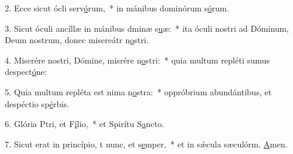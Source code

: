 2. Ecce sicut ócli serv\uline{ó}rum,~* in mánibus dominórum s\uline{ó}rum.\par 
3. Sicut óculi ancíllæ in mánibus dminæ s\uline{u}æ:~* ita óculi nostri ad Dóminum, Deum nostrum, donec misereátr n\uline{o}stri.\par 
4. Miserére nostri, Dómine, misrére n\uline{o}stri:~* quia multum repléti sumus despect\uline{ó}ne:\par 
5. Quia multum repléta est nima n\uline{o}stra:~* oppróbrium abundántibus, et despéctio sp\uline{é}rbis.\par 
6. Glória Ptri, et F\uline{í}lio,~* et Spirítu S\uline{a}ncto.\par 
7. Sicut erat in princípio, t nunc, et s\uline{e}mper,~* et in sǽcula sæculórm. \uline{A}men.\par 
